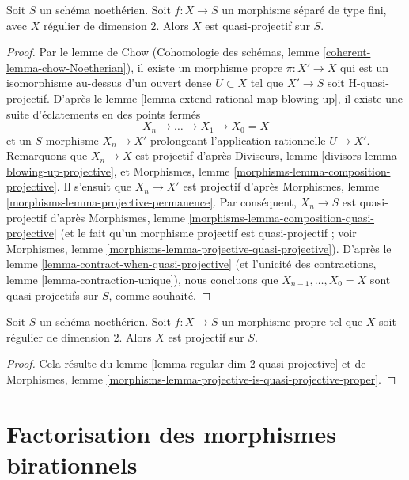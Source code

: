\begin{lemma} \label{lemma-regular-dim-2-quasi-projective} Soit $S$ un schéma noethérien. Soit $f : X \to S$ un morphisme séparé de type fini, avec $X$ régulier de dimension $2$. Alors $X$ est quasi-projectif sur $S$. \end{lemma}

\begin{proof} Par le lemme de Chow (Cohomologie des schémas, lemme \ref{coherent-lemma-chow-Noetherian}), il existe un morphisme propre $\pi : X' \to X$ qui est un isomorphisme au-dessus d'un ouvert dense $U \subset X$ tel que $X' \to S$ soit H-quasi-projectif. D'après le lemme \ref{lemma-extend-rational-map-blowing-up}, il existe une suite d'éclatements en des points fermés $$
X_n \to \ldots \to X_1 \to X_0 = X
$$ et un $S$-morphisme $X_n \to X'$ prolongeant l'application rationnelle $U \to X'$. Remarquons que $X_n \to X$ est projectif d'après Diviseurs, lemme \ref{divisors-lemma-blowing-up-projective}, et Morphismes, lemme \ref{morphisms-lemma-composition-projective}. Il s'ensuit que $X_n \to X'$ est projectif d'après Morphismes, lemme \ref{morphisms-lemma-projective-permanence}. Par conséquent, $X_n \to S$ est quasi-projectif d'après Morphismes, lemme \ref{morphisms-lemma-composition-quasi-projective} (et le fait qu'un morphisme projectif est quasi-projectif ; voir Morphismes, lemme \ref{morphisms-lemma-projective-quasi-projective}). D'après le lemme \ref{lemma-contract-when-quasi-projective} (et l'unicité des contractions, lemme \ref{lemma-contraction-unique}), nous concluons que $X_{n - 1}, \ldots, X_0 = X$ sont quasi-projectifs sur $S$, comme souhaité. \end{proof}

\begin{lemma} \label{lemma-regular-dim-2-projective} Soit $S$ un schéma noethérien. Soit $f : X \to S$ un morphisme propre tel que $X$ soit régulier de dimension $2$. Alors $X$ est projectif sur $S$. \end{lemma}

\begin{proof} Cela résulte du lemme \ref{lemma-regular-dim-2-quasi-projective} et de Morphismes, lemme \ref{morphisms-lemma-projective-is-quasi-projective-proper}. \end{proof}






\section{Factorisation des morphismes birationnels} \label{section-factorizing}

